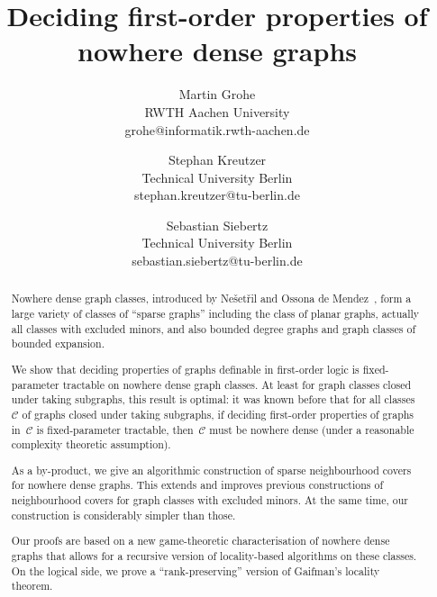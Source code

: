 \documentclass[11pt]{article}
\numberwithin{equation}{section}
\newcommand{\red}{\color{red}}
\newcommand{\green}{\color{gruen}}
\newcounter{rbcounter}
\newcommand{\randbem}[3]{\stepcounter{rbcounter}\parbox{0mm}{\hspace*{-0.3em}#1{}$^{\arabic{rbcounter}}$}\marginpar{#1\raggedright\footnotesize\textbf{#2$^{\arabic{rbcounter}}$: }#3}}
\newcommand{\stephan}[1]{\randbem{\red}{St}{#1}}
\newcommand{\sebastian}[1]{\randbem{\green}{Se}{#1}}
\begin{document}
\title{Deciding first-order
  properties of nowhere dense graphs}


\author{Martin Grohe\\RWTH Aachen
  University\\grohe@informatik.rwth-aachen.de \and Stephan
  Kreutzer\\Technical University Berlin\\stephan.kreutzer@tu-berlin.de
  \and Sebastian Siebertz\\Technical University Berlin\\sebastian.siebertz@tu-berlin.de}


\date{}


\maketitle

\begin{abstract}
  Nowhere dense graph classes, introduced by Ne\v set\v ril and Ossona
  de Mendez~\cite{NesetrilO11}, form a large variety of classes of
  ``sparse graphs'' including the class of planar graphs, actually all
  classes with excluded minors, and also bounded degree graphs and
  graph classes of bounded expansion.

  We show that deciding properties of graphs definable in first-order
  logic is fixed-parameter tractable on nowhere dense graph
  classes. At least for graph classes closed under taking subgraphs,
  this result is optimal: it was known before that for all
  classes~$\mathcal C$ of graphs closed under taking subgraphs, if
  deciding first-order properties of graphs in~$\mathcal C$ is
  fixed-parameter tractable, then~$\mathcal C$ must be nowhere dense
  (under a reasonable complexity theoretic assumption).

  As a by-product, we give an algorithmic construction of sparse
  neighbourhood covers for nowhere dense graphs. This extends and
  improves previous constructions of neighbourhood covers for graph
  classes with excluded minors. At the same time, our construction is
  considerably simpler than those.

Our proofs are based on a new game-theoretic characterisation of
  nowhere dense graphs that allows for a recursive version of
  locality-based algorithms
  on these classes. On the logical side, we prove a
  ``rank-preserving'' version of Gaifman's locality
  theorem.
\end{abstract}
\end{document}
